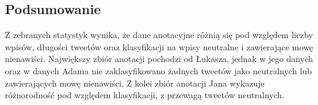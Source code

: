 \documentclass[12pt]{article}
\begin{document}
\subsection{Podsumowanie}
Z zebranych statystyk wynika, że dane anotacyjne różnią się pod względem liczby wpisów, długości tweetów oraz klasyfikacji na wpisy neutralne i zawierające mowę nienawiści. Największy zbiór anotacji pochodzi od Łukasza, jednak w jego danych oraz w danych Adama nie zaklasyfikowano żadnych tweetów jako neutralnych lub zawierających mowę nienawiści. Z kolei zbiór anotacji Jana wykazuje różnorodność pod względem klasyfikacji, z przewagą tweetów neutralnych.
\end{document}
